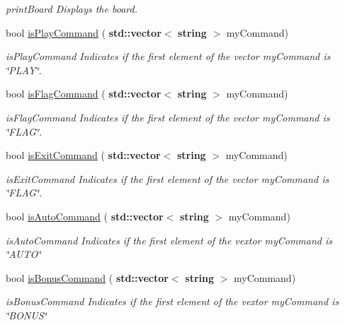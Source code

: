 \begin{DoxyCompactItemize}
\begin{DoxyCompactList}\small\item\em print\+Board Displays the board. \end{DoxyCompactList}\item 
bool \hyperlink{class_view_aad0487a7cc70e7e03ce8d0dc39c570c4}{is\+Play\+Command} (\textbf{ std\+::vector}$<$ \textbf{ string} $>$ my\+Command)
\begin{DoxyCompactList}\small\item\em is\+Play\+Command Indicates if the first element of the vector my\+Command is \char`\"{}\+P\+L\+A\+Y\char`\"{}. \end{DoxyCompactList}\item 
bool \hyperlink{class_view_a26d427abb478561381207ed8d76d84c4}{is\+Flag\+Command} (\textbf{ std\+::vector}$<$ \textbf{ string} $>$ my\+Command)
\begin{DoxyCompactList}\small\item\em is\+Flag\+Command Indicates if the first element of the vector my\+Command is \char`\"{}\+F\+L\+A\+G\char`\"{}. \end{DoxyCompactList}\item 
bool \hyperlink{class_view_ac3a7757f7c123e73569e3b9bcf89df86}{is\+Exit\+Command} (\textbf{ std\+::vector}$<$ \textbf{ string} $>$ my\+Command)
\begin{DoxyCompactList}\small\item\em is\+Exit\+Command Indicates if the first element of the vector my\+Command is \char`\"{}\+F\+L\+A\+G\char`\"{}. \end{DoxyCompactList}\item 
bool \hyperlink{class_view_aabe180bf6a2b9b597fb49107f609215a}{is\+Auto\+Command} (\textbf{ std\+::vector}$<$ \textbf{ string} $>$ my\+Command)
\begin{DoxyCompactList}\small\item\em is\+Auto\+Command Indicates if the first element of the vextor my\+Command is \char`\"{}\+A\+U\+T\+O\char`\"{} \end{DoxyCompactList}\item 
bool \hyperlink{class_view_a203e416b63702c5278f471508a8b60e8}{is\+Bonus\+Command} (\textbf{ std\+::vector}$<$ \textbf{ string} $>$ my\+Command)
\begin{DoxyCompactList}\small\item\em is\+Bonus\+Command Indicates if the first element of the vextor my\+Command is \char`\"{}\+B\+O\+N\+U\+S\char`\"{} \end{DoxyCompactList}\item 

\end{DoxyCompactItemize}
